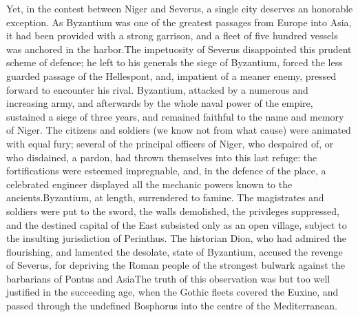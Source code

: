 Yet, in the contest between Niger and Severus, a single city
deserves an honorable exception. As Byzantium was one of the
greatest passages from Europe into Asia, it had been provided
with a strong garrison, and a fleet of five hundred vessels was
anchored in the harbor.\footnotemark[53] The impetuosity of Severus
disappointed this prudent scheme of defence; he left to his
generals the siege of Byzantium, forced the less guarded passage
of the Hellespont, and, impatient of a meaner enemy, pressed
forward to encounter his rival. Byzantium, attacked by a numerous
and increasing army, and afterwards by the whole naval power of
the empire, sustained a siege of three years, and remained
faithful to the name and memory of Niger. The citizens and
soldiers (we know not from what cause) were animated with equal
fury; several of the principal officers of Niger, who despaired
of, or who disdained, a pardon, had thrown themselves into this
last refuge: the fortifications were esteemed impregnable, and,
in the defence of the place, a celebrated engineer displayed all
the mechanic powers known to the ancients.\footnotemark[54] Byzantium, at
length, surrendered to famine. The magistrates and soldiers were
put to the sword, the walls demolished, the privileges
suppressed, and the destined capital of the East subsisted only
as an open village, subject to the insulting jurisdiction of
Perinthus. The historian Dion, who had admired the flourishing,
and lamented the desolate, state of Byzantium, accused the
revenge of Severus, for depriving the Roman people of the
strongest bulwark against the barbarians of Pontus and Asia\footnotemark[55]
The truth of this observation was but too well justified in the
succeeding age, when the Gothic fleets covered the Euxine, and
passed through the undefined Bosphorus into the centre of the
Mediterranean.



